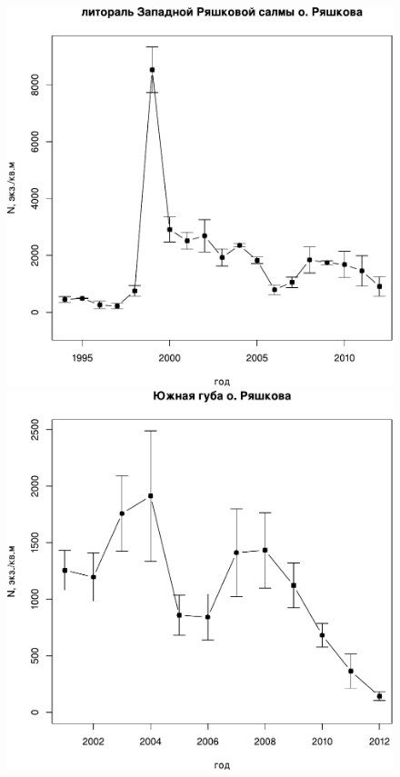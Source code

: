 \begin{figure}[p]
\begin{minipage}[b]{.49\linewidth}
\begin{center}
		\includegraphics[width=\linewidth]{../White_Sea/Ryashkov_ZRS/N2_dynamic1.pdf}
	\end{center}
	\end{minipage}
	\begin{minipage}[b]{.49\linewidth}
	\begin{center}
		\includegraphics[width=\linewidth]{../White_Sea/Ryashkov_YuG/N2_dynamic1.pdf}

\end{center}
\end{minipage}
\end{figure}
